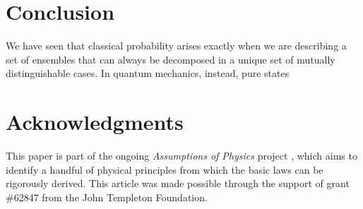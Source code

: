 \documentclass[10pt,twocolumn, nofootinbib]{revtex4-2}
\begin{document}
\section{Conclusion}

We have seen that classical probability arises exactly when we are describing a set of ensembles that can always be decomposed in a unique set of mutually distinguishable cases. In quantum mechanics, instead, pure states


\section*{Acknowledgments}
This paper is part of the ongoing \textit{Assumptions of Physics} project \cite{aop-book}, which aims to identify a handful of physical principles from which the basic laws can be rigorously derived. This article was made possible through the support of grant \#62847 from the John Templeton Foundation.




\newcommand{\pj}[1] {\underbar{$#1$}}
\end{document}
